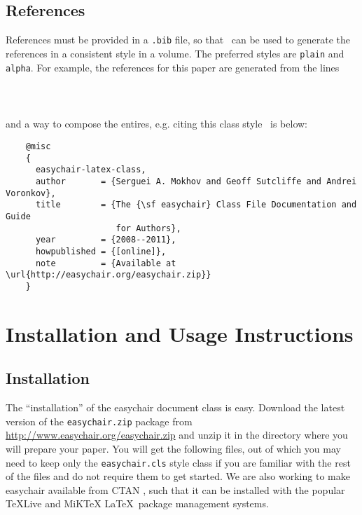 \documentclass[withtimes]{easychair}
\newcommand{\easychair}{\textsf{easychair}}
\newcommand{\miktex}{MiK{\TeX}}
\begin{document}
\subsection{References}
\label{sect:references}

References must be provided in a {\tt .bib} file, so that \BibTeX\ can
be used to generate the references in a consistent style in a volume.
The preferred styles are {\tt plain} and {\tt alpha}.
For example, the references for this paper are generated from the
lines
\begin{verbatim}
    
    
\end{verbatim}
and a way to compose the entires, e.g. citing this class style~\cite{easychair-latex-class}
is below:
\small
\begin{verbatim}
    @misc
    {
      easychair-latex-class,
      author       = {Serguei A. Mokhov and Geoff Sutcliffe and Andrei Voronkov},
      title        = {The {\sf easychair} Class File Documentation and Guide
                      for Authors},
      year         = {2008--2011},
      howpublished = {[online]},
      note         = {Available at \url{http://easychair.org/easychair.zip}}
    }
\end{verbatim}
\normalsize

\section{Installation and Usage Instructions}
\label{sect:installation-usage}

\subsection{Installation}

The ``installation'' of the {\easychair} document class is easy.
Download the latest version of the \texttt{easychair.zip} package 
from \url{http://www.easychair.org/easychair.zip}
and unzip it in the directory where you will prepare your paper.
You will get the following files, out of which you may need to keep only 
the \texttt{easychair.cls} style class if you are familiar with the rest 
of the files and do not require them to get started.
We are also working to make {\easychair} available from CTAN \cite{ctan},
such that it can be installed with the popular \TeX Live \cite{texlive} and
{\miktex} \cite{miktex} \LaTeX\ package management systems.
\end{document}
